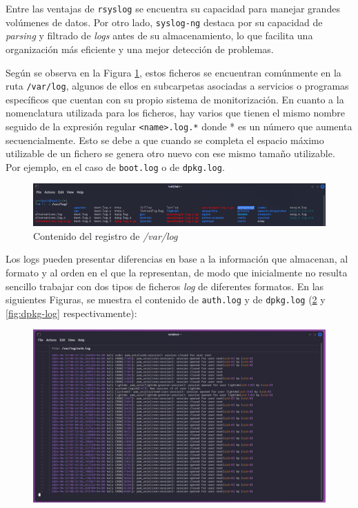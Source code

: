 Entre las ventajas de \verb|rsyslog| se encuentra su capacidad para manejar grandes volúmenes de datos. Por otro lado, \verb|syslog-ng| destaca por su capacidad de \textit{parsing} y filtrado de \textit{logs} antes de su almacenamiento, lo que facilita una organización más eficiente y una mejor detección de problemas.


Según se observa en la Figura \ref{fig:varlog}, estos ficheros se encuentran comúnmente en la ruta \verb|/var/log|, algunos de ellos en subcarpetas asociadas a servicios o programas específicos que cuentan con su propio sistema de monitorización. En cuanto a la nomenclatura utilizada para los ficheros, hay varios que tienen el mismo nombre seguido de la expresión regular \verb|<name>.log.*| donde * es un número que aumenta secuencialmente. Esto se debe a que cuando se completa el espacio máximo utilizable de un fichero se genera otro nuevo con ese mismo tamaño utilizable. Por ejemplo, en el caso de \verb|boot.log| o de \verb|dpkg.log|.

\begin{figure}[H]
    \centering
    \includegraphics[width=\textwidth]{imagenes/var-log.png}
    \caption{Contenido del registro de \textit{/var/log}}
    \label{fig:varlog}
\end{figure}

\newpage

Los logs pueden presentar diferencias en base a la información que almacenan, al formato y al orden en el que la representan, de modo que inicialmente no resulta sencillo trabajar con dos tipos de ficheros \textit{log} de diferentes formatos. En las siguientes Figuras, se muestra el contenido de \verb|auth.log| y de \verb|dpkg.log| (\ref{fig:auth-log} y \ref{fig:dpkg-log} respectivamente):

\begin{figure}[H]
\centering
\includegraphics[width=\linewidth]{imagenes/log-structure.png}
\label{fig:auth-log}
\end{figure}

